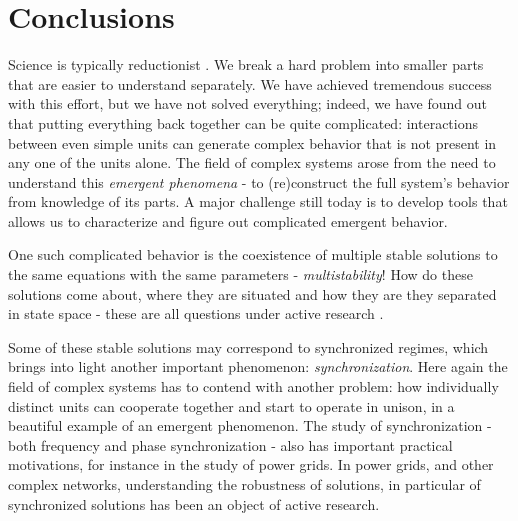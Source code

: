 \chapter{Conclusions}\label{chap:conclusions}

Science is typically reductionist \cite{strogatzsyncbook}. We break a hard problem into smaller parts that are easier to understand separately. We have achieved tremendous success with this effort, but we have not solved everything; indeed, we have found out that putting everything back together can be quite complicated: interactions between even simple units can generate complex behavior that is not present in any one of the units alone.
The field of complex systems arose from the need to understand this \textit{emergent phenomena} - to (re)construct the full system's behavior from knowledge of its parts. A major challenge still today is to develop tools that allows us to characterize and figure out complicated emergent behavior.

One such complicated behavior is the coexistence of multiple stable solutions to the same equations with the same parameters - \textit{multistability}! How do these solutions come about, where they are situated and how they are they separated in state space - these are all questions under active research \cite{feudel2008complex, pisarchik2022multistability, zhang2021basins}. 

Some of these stable solutions may correspond to synchronized regimes, which brings into light another important phenomenon: \textit{synchronization}. Here again the field of complex systems has to contend with another problem: how individually distinct units can cooperate together and start to operate in unison, in a beautiful example of an emergent phenomenon. The study of synchronization - both frequency and phase synchronization - also has important practical motivations, for instance in the study of power grids. In power grids, and other complex networks, understanding the robustness of solutions, in particular of synchronized solutions has been an object of active research. 

